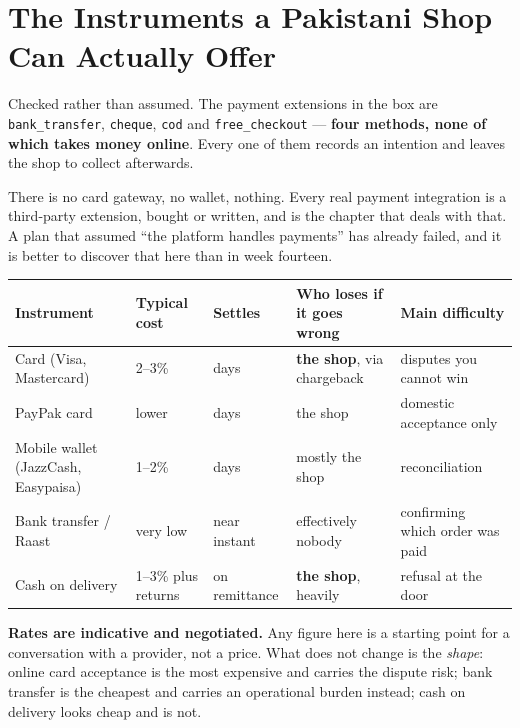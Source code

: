\section{The Instruments a Pakistani Shop Can Actually Offer}

\begin{alertbox}
Checked rather than assumed. The payment extensions in the box are
\texttt{bank\_transfer}, \texttt{cheque}, \texttt{cod} and
\texttt{free\_checkout} --- \textbf{four methods, none of which takes money
online}. Every one of them records an intention and leaves the shop to collect
afterwards.

\smallskip
There is no card gateway, no wallet, nothing. Every real payment integration is
a third-party extension, bought or written, and  is the chapter
that deals with that. A plan that assumed ``the platform handles payments'' has
already failed, and it is better to discover that here than in week fourteen.
\end{alertbox}

\begin{longtable}{@{}L{2.9cm}L{2.5cm}L{2.4cm}L{3.0cm}L{3.1cm}@{}}
\toprule
{}
\textbf{Instrument} & \textbf{Typical cost} & \textbf{Settles} &
\textbf{Who loses if it goes wrong} & \textbf{Main difficulty} \\
\midrule
\endhead
Card (Visa, Mastercard) & 2--3\% & days & \textbf{the shop}, via chargeback &
disputes you cannot win \\
PayPak card & lower & days & the shop & domestic acceptance only \\
Mobile wallet (JazzCash, Easypaisa) & 1--2\% & days & mostly the shop &
reconciliation \\
Bank transfer / Raast & very low & near instant & effectively nobody &
confirming which order was paid \\
Cash on delivery & 1--3\% plus returns & on remittance & \textbf{the shop},
heavily & refusal at the door \\
\bottomrule
\end{longtable}

\smallskip
\textbf{Rates are indicative and negotiated.} Any figure here is a starting
point for a conversation with a provider, not a price. What does not change is
the \emph{shape}: online card acceptance is the most expensive and carries the
dispute risk; bank transfer is the cheapest and carries an operational burden
instead; cash on delivery looks cheap and is not.

